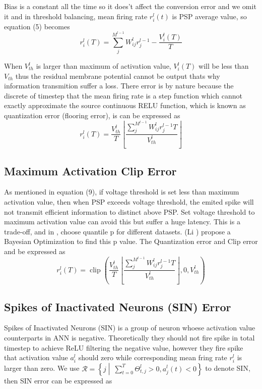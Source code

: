\documentclass{article}
\begin{document}
Bias is a constant all the time so it does't affect the conversion error and we omit it and in threshold balancing, mean firing rate $r_i^l(t)$ is PSP average value, so equation (5) becomes
\begin{equation}
  r_i^l(T) = \sum_j^{M^{l-1}}W_{ij}^lr_j^{l-1} - \frac{V_i^l(T)}{T}
  \label{eq:8}
\end{equation}

When $V_{th}^l$ is larger than maximum of activation value, $V_i^l(T)$ will be less than $V_{th}$ thus the residual membrane potential cannot be output thats why information transmition suffer a loss.
There error is by nature because the discrete of timestep that the mean firing rate is a step function which cannot exactly approximate the source continuous RELU function, which is known as quantization error (flooring error), is can be expressed as
\begin{equation}
  r_i^l(T) = \frac{V_{th}^l}{T}\left\lfloor\frac{\sum_j^{M^{l-1}}W_{ij}^lr_j^{l-1}T}{V_{th}^l}\right\rfloor
\end{equation}

\subsection{Maximum Activation Clip Error}
As mentioned in equation (9), if voltage threshold is set less than maximum activation value, then when PSP exceeds voltage threshold, the emited spike will not transmit efficient information to distinct above PSP.
Set voltage threshold to maximum activation value can avoid this but suffer a huge latency. This is a trade-off, and in \cite{rueckauer2017conversion}, choose quantile p for different datasets. (Li ) propose a Bayesian Optimization to find this p value.
The Quantization error and Clip error and be expressed as
\begin{equation}
  r_i^l(T) = \operatorname{clip}\left(\frac{V_{th}^l}{T}\left\lfloor\frac{\sum_j^{M^{l-1}}W_{ij}^lr_j^{l-1}T}{V_{th}^l}\right\rfloor, 0, V_{th}^l\right)
\end{equation}


\subsection{Spikes of Inactivated Neurons (SIN) Error}
Spikes of Inactivated Neurons (SIN) is a group of neuron whoese activation value counterparts in ANN is negative. Theoretically they should not fire spike in total timestep to achieve ReLU filtering the negative value, however they fire spike that activation value $a_i^l$ should zero while corresponding 
mean fring rate $r_i^l$ is larger than zero. 
We use $\mathcal{R}=\left\{j \middle\vert\ \sum_{t=0}^T\Theta_{t,j}^l >0, a_j^l(t) < 0\right\}$ to denote SIN, then SIN error can be expressed as
\end{document}
